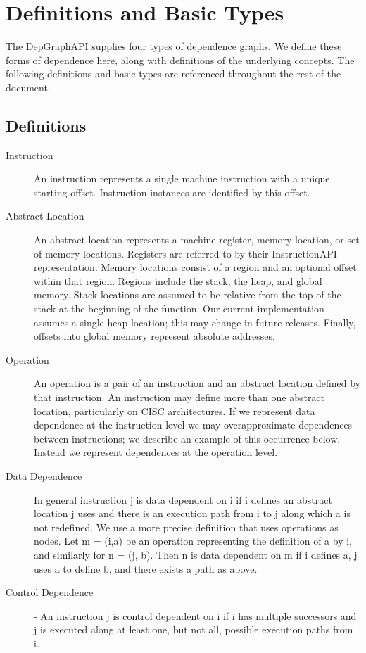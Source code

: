 \documentclass[12pt,titlepage]{article}
\begin{document}
\section{Definitions and Basic Types}

The DepGraphAPI supplies four types of dependence graphs. We define
these forms of dependence here, along with definitions of the
underlying concepts. The following definitions and basic types are
referenced throughout the rest of the document.

\subsection{Definitions}
\begin{description}
\item[Instruction] An instruction represents a single machine
instruction with a unique starting offset. Instruction instances are
identified by this offset.
\item[Abstract Location] An abstract location represents a machine
register, memory location, or set of memory locations. Registers are
referred to by their InstructionAPI representation. Memory locations
consist of a region and an optional offset within that region. Regions
include the stack, the heap, and global memory. Stack locations are
assumed to be relative from the top of the stack at the beginning of
the function. Our current implementation assumes a single heap
location; this may change in future releases. Finally, offsets into
global memory represent absolute addresses.
\item[Operation] An operation is a pair of an instruction and an
abstract location defined by that instruction. An instruction may
define more than one abstract location, particularly on CISC
architectures. If we represent data dependence at the instruction
level we may overapproximate dependences between instructions; we
describe an example of this occurrence below. Instead we represent
dependences at the operation level.
\item[Data Dependence] In general instruction j is data dependent on i
if i defines an abstract location j uses and there is an execution path
from i to j along which a is not redefined. We use a more precise
definition that uses operations as nodes. Let m = (i,a) be an
operation representing the definition of a by i, and similarly for n =
(j, b). Then n is data dependent on m if i defines a, j uses a to
define b, and there exists a path as above.
\item[Control Dependence] - An instruction j is control dependent on i
if i has multiple successors and j is executed along at least one, but
not all, possible execution paths from i.
\end{description}
\end{document}
